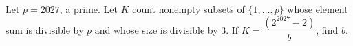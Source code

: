 Let $p=2027$, a prime. Let $K$ count nonempty subsets of $\{1,\ldots,p\}$ whose element sum is divisible by $p$ and whose size is divisible by $3$. If $K=\dfrac{(2^{2027}-2)}{b}$, find $b$.
